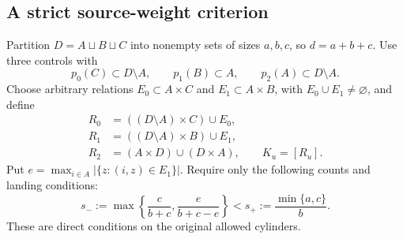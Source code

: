 \documentclass[11pt,reqno]{amsart}
\numberwithin{equation}{section}
\theoremstyle{definition}
\begin{document}
\subsection{A strict source-weight criterion}
Partition $D=A\sqcup B\sqcup C$ into nonempty sets of sizes
$a,b,c$, so $d=a+b+c$. Use three controls with
\begin{equation}\label{eq:weight-land}
 p_0(C)\subset D\setminus A,\qquad p_1(B)\subset A,
 \qquad p_2(A)\subset D\setminus A.
\end{equation}
Choose arbitrary relations $E_0\subset A\times C$ and
$E_1\subset A\times B$, with $E_0\cup E_1\ne\varnothing$,
and define
\begin{align}
 R_0&=((D\setminus A)\times C)\cup E_0,\nonumber\\
 R_1&=((D\setminus A)\times B)\cup E_1,\label{eq:weight-domains}\\
 R_2&=(A\times D)\cup(D\times A),\qquad K_u=[R_u].\nonumber
\end{align}
Put $e=\max_{i\in A}|\{z:(i,z)\in E_1\}|$. Require only
the following counts and landing conditions:
\begin{equation}\label{eq:weight-count}
 s_-:=\max\left\{\frac c{b+c},\frac e{b+c-e}\right\}
 <s_+:=\frac{\min\{a,c\}}b.
\end{equation}
These are direct conditions on the original allowed cylinders.
\end{document}

